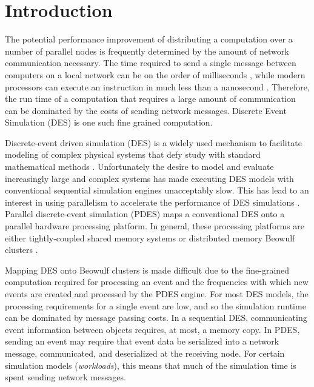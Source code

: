 \documentclass[11pt]{book}
\begin{document}
\tableofcontents \markright{ }
\listoffigures \markright{ }
\listoftables \markright{ }

\clearpage
{} \setcounter{page}{1}

\chapter{Introduction}\label{intro} 

The potential performance improvement of distributing a computation over a number of parallel nodes is frequently determined by the amount of network communication necessary. The time required to send a single message between computers on a local network can be on the order of milliseconds \cite{larson-07}, while modern processors can execute an instruction in much less than a nanosecond \cite{sprangle-02}. Therefore, the run time of a computation that requires a large amount of communication can be dominated by the costs of sending network messages.  Discrete Event Simulation (DES) is one such fine grained computation.

Discrete-event driven simulation (DES) is a widely used mechanism to facilitate modeling of complex physical systems that defy study with standard mathematical methods \cite{law-00}. Unfortunately the desire to model and evaluate increasingly large and complex systems has made executing DES models with conventional sequential simulation engines unacceptably slow. This has lead to an interest in using parallelism to accelerate the performance of DES simulations \cite{fujimoto-90}. Parallel discrete-event simulation (PDES) maps a conventional DES onto a parallel hardware processing platform. In general, these processing platforms are either tightly-coupled shared memory systems or distributed memory Beowulf clusters \cite{hennessy-12}.

Mapping DES onto Beowulf clusters is made difficult due to the fine-grained computation required for processing an event and the frequencies with which new events are created and processed by the PDES engine. For most DES models, the processing requirements for a single event are low, and so the simulation runtime can be dominated by message passing costs. In a sequential DES, communicating event information between objects requires, at most, a memory copy. In PDES, sending an event may require that event data be serialized into a network message, communicated, and deserialized at the receiving node. For certain simulation models (\emph{workloads}), this means that much of the simulation time is spent sending network messages.
\end{document}
